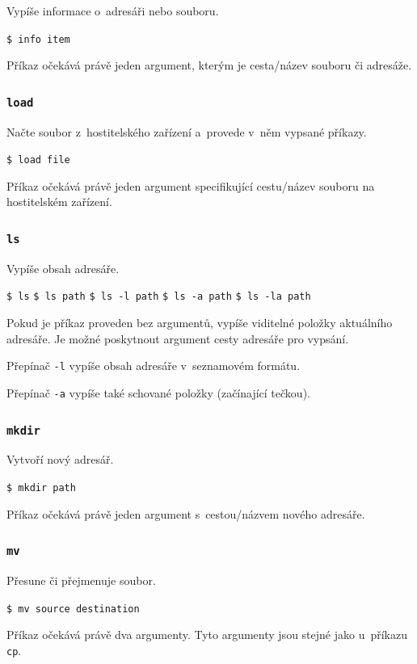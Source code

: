 \documentclass[12pt]{article}
\begin{document}
Vypíše informace o~adresáři nebo souboru.

\texttt{\$ info item}

Příkaz očekává právě jeden argument, kterým je cesta/název souboru či adresáže.

\subsubsection{\texttt{load}}\label{sec:load}

Načte soubor z~hostitelského zařízení a~provede v~něm vypsané příkazy.

\texttt{\$ load file}

Příkaz očekává právě jeden argument specifikující cestu/název souboru na hostitelském zařízení.

\subsubsection{\texttt{ls}}\label{sec:ls}

Vypíše obsah adresáře.

\texttt{\$ ls}\qquad
\texttt{\$ ls path}\qquad
\texttt{\$ ls -l path}\qquad
\texttt{\$ ls -a path}\qquad
\texttt{\$ ls -la path}

Pokud je příkaz proveden bez argumentů, vypíše viditelné položky aktuálního adresáře.
Je možné poskytnout argument cesty adresáře pro vypsání.

Přepínač \texttt{-l} vypíše obsah adresáře v~seznamovém formátu.

Přepínač \texttt{-a} vypíše také schované položky (začínající tečkou).

\subsubsection{\texttt{mkdir}}\label{sec:mkdir}

Vytvoří nový adresář.

\texttt{\$ mkdir path}

Příkaz očekává právě jeden argument s~cestou/názvem nového adresáře.

\subsubsection{\texttt{mv}}\label{sec:mv}

Přesune či přejmenuje soubor.

\texttt{\$ mv source destination}

Příkaz očekává právě dva argumenty. Tyto argumenty jsou stejné jako u~příkazu \texttt{cp}.
\end{document}
